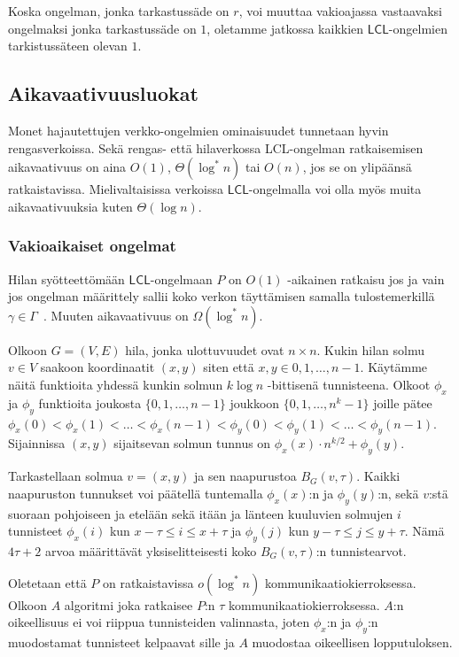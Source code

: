 \documentclass[12pt,finnish]{tktltiki2}
\theoremstyle{definition}
\theoremstyle{remark}
\newcommand*{\lcl}{\ensuremath{\mathsf{LCL}}}
\begin{document}
Koska ongelman, jonka tarkastussäde on $r$, voi muuttaa vakioajassa vastaavaksi ongelmaksi jonka tarkastussäde on $1$, oletamme jatkossa kaikkien \lcl -ongelmien tarkistussäteen olevan $1$.

\subsection{Aikavaativuusluokat}
Monet hajautettujen verkko-ongelmien ominaisuudet tunnetaan hyvin rengasverkoissa. Sekä rengas- että hilaverkossa LCL-ongelman ratkaisemisen aikavaativuus on aina $O(1)$, $\Theta (\log^* n)$ tai $O(n)$, jos se on ylipäänsä ratkaistavissa. Mielivaltaisissa verkoissa \lcl -ongelmalla voi olla myös muita aikavaativuuksia kuten $\Theta(\log n)$.

\subsubsection{Vakioaikaiset ongelmat}
Hilan syötteettömään \lcl -ongelmaan $P$ on $O(1)$ -aikainen ratkaisu jos ja vain jos ongelman määrittely sallii koko verkon täyttämisen samalla tulostemerkillä $\gamma \in \Gamma$~\cite{chang}. Muuten aikavaativuus on $\Omega(\log^* n)$.

Olkoon $G = (V, E)$ hila, jonka ulottuvuudet ovat $n \times n$. Kukin hilan solmu $v \in V$ saakoon koordinaatit $(x, y)$ siten että $x, y \in {0, 1, \dots, n-1}$. Käytämme näitä funktioita yhdessä kunkin solmun $k \log n$ -bittisenä tunnisteena. Olkoot $\phi_x$ ja $\phi_y$ funktioita joukosta $\{0, 1,\dots, n-1\}$ joukkoon $\{0, 1,\dots,n^k-1\}$ joille pätee $\phi_x(0) < \phi_x(1) < \dots < \phi_x(n-1) < \phi_y(0) < \phi_y(1) < \dots < \phi_y(n-1)$. Sijainnissa $(x, y)$ sijaitsevan solmun tunnus on $\phi_x(x) \cdot n^{k/2} + \phi_y(y)$.

Tarkastellaan solmua $v = (x, y)$ ja sen naapurustoa $B_G(v, \tau)$. Kaikki naapuruston tunnukset voi päätellä tuntemalla $\phi_x(x)$:n ja $\phi_y(y)$:n, sekä $v$:stä suoraan pohjoiseen ja etelään sekä itään ja länteen kuuluvien solmujen $i$ tunnisteet $\phi_x(i)$ kun $x - \tau \leq i \leq x + \tau$ ja $\phi_y(j)$ kun $y - \tau \leq j \leq y + \tau$. Nämä $4\tau + 2$ arvoa määrittävät yksiselitteisesti koko $B_G(v, \tau)$:n tunnistearvot.

Oletetaan että $P$ on ratkaistavissa $o(\log^* n)$ kommunikaatiokierroksessa. Olkoon $A$ algoritmi joka ratkaisee $P$:n $\tau$ kommunikaatiokierroksessa. $A$:n oikeellisuus ei voi riippua tunnisteiden valinnasta, joten $\phi_x$:n ja $\phi_y$:n muodostamat tunnisteet kelpaavat sille ja $A$ muodostaa oikeellisen lopputuloksen.
\end{document}
